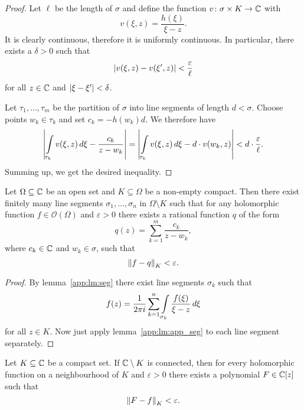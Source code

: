 \begin{proof}
Let $\ell$ be the length of $\sigma$ and define the function
$v \colon \sigma \times K \to \mathbb{C}$ with
\[
v(\xi, z) = \frac{h(\xi)}{\xi - z}.
\]
It is clearly continuous, therefore it is uniformly continuous. In
particular, there exists a $\delta > 0$ such that
\[
\left\lvert v(\xi, z) - v(\xi', z)\right\rvert < \frac{\varepsilon}{\ell}
\]
for all $z \in \mathbb{C}$ and $\left\lvert \xi - \xi'\right\rvert < \delta$.

Let $\tau_1, \dots, \tau_m$ be the partition of $\sigma$ into line
segments of length $d < \sigma$. Choose points $w_k \in \tau_k$ and
set $c_k = - h(w_k) d$. We therefore have
\[
\left\lvert \int\limits_{\tau_k} v(\xi, z)\,d\xi - \frac{c_k}{z - w_k}\right\rvert =
\left\lvert \int\limits_{\tau_k} v(\xi, z)\,d\xi - d \cdot v(w_k, z)\right\rvert <
d \cdot \frac{\varepsilon}{\ell}.
\]
Summing up, we get the desired inequality.
\end{proof}

\begin{lema}
Let $\Omega \subseteq \mathbb{C}$ be an open set and $K \subseteq \Omega$
be a non-empty compact. Then there exist finitely many line
segments $\sigma_1, \dots, \sigma_n$ in $\Omega \setminus K$ such
that for any holomorphic function $f \in \mathcal{O}(\Omega)$ and
$\varepsilon > 0$ there exists a rational function $q$ of the form
\[
q(z) = \sum_{k=1}^m \frac{c_k}{z - w_k},
\]
where $c_k \in \mathbb{C}$ and $w_k \in \sigma$, such that
\[
\left\lVert f - q\right\rVert_K < \varepsilon.
\]
\end{lema}

\begin{proof}
By lemma~\ref{app:lm:seg} there exist line segments $\sigma_k$ such
that
\[
f(z) = \frac{1}{2 \pi i} \sum_{k=1}^n
\int\limits_{\sigma_k} \frac{f(\xi)}{\xi - z}\,d\xi
\]
for all $z \in K$. Now just apply lemma~\ref{app:lm:app_seg} to
each line segment separately.
\end{proof}

\begin{izrek}
Let $K \subseteq \mathbb{C}$ be a compact set. If $\mathbb{C} \setminus K$ is
connected, then for every holomorphic function on a neighbourhood
of $K$ and $\varepsilon > 0$ there exists a polynomial
$F \in \mathbb{C}[z]$ such that
\[
\left\lVert F - f\right\rVert_K < \varepsilon.
\]
\end{izrek}
